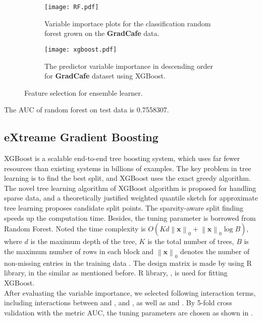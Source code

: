 \begin{figure}[htb]
    \centering
    \begin{subfigure}{.5\linewidth}
	\centering
	\texttt{[image: RF.pdf]}
	\caption{Variable importace plots for the classification random forest grown on the \textbf{GradCafe} data.}
	\label{fig:rf}
    \end{subfigure}%
    \begin{subfigure}{.5\linewidth}
    \centering
    \texttt{[image: xgboost.pdf]}
    \caption{The predictor variable importance in descending order for \textbf{GradCafe} dataset using XGBoost.}
    \label{fig: xgb}
\end{subfigure}
    \caption{Feature selection for  ensemble learner.}
\end{figure}
The AUC of random forest on test data is 0.7558307. 

\subsection{eXtreame Gradient Boosting} \label{sub: xgb}
XGBoost is a scalable end-to-end tree boosting system, which uses far fewer resources than existing systems in billions of examples. The key problem in tree learning is to find the best split, and XGBoost uses the exact greedy algorithm. The novel tree learning algorithm of XGBoost algorithm is proposed for handling sparse data, and a theoretically justified weighted quantile sketch for approximate tree learning proposes candidate split points. The sparsity-aware split finding speeds up the computation time. Besides, the tuning parameter  is borrowed from Random Forest.
Noted the time complexity is $O(Kd\left\|\mathbf{x}\right\|_0+\left\|\mathbf{x}\right\|_0\log B)$, where $d$ is the maximum depth of the tree, $K$ is the total number of trees, $B$ is the maximum number of rows in each block and $\left\|\mathbf{x}\right\|_0$ denotes the number of non-missing entries in the training data \cite{chen:2016:xgboost}.
The design matrix is made by using R library,  in the similar as mentioned before. R library, , is used for fitting XGBoost. \\
After evaluating the variable importance, we selected following interaction terms, including interactions between  and ,  and , as well as  and . 
By 5-fold cross validation with the metric AUC, the tuning parameters are chosen as shown in .

